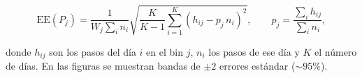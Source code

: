 \begin{equation*}
    \mathrm{EE}(P_j) = \frac{1}{W_j \sum_i n_i}\sqrt{\frac{K}{K-1}\sum_{i=1}^{K}\left(h_{ij} - p_j\, n_i\right)^2}, \qquad p_j = \frac{\sum_i h_{ij}}{\sum_i n_i},
\end{equation*}

donde $h_{ij}$ son los pasos del día $i$ en el bin $j$, $n_i$ los pasos de ese día y $K$ el número de días. En las figuras se muestran bandas de $\pm 2$ errores 
estándar ($\sim 95 \%$).



